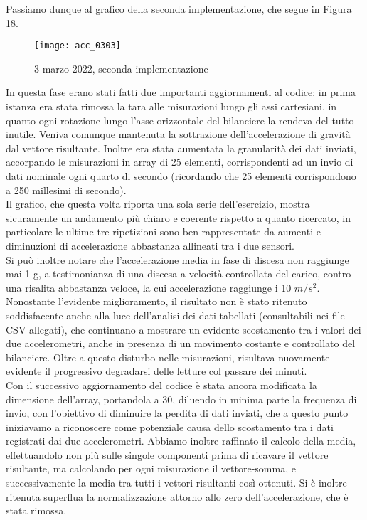 \documentclass[fleqn,10pt]{SelfArx} %
\begin{document}
Passiamo dunque al grafico della seconda implementazione, che segue in Figura 18.

\begin{figure}[htb]\centering
	\texttt{[image: acc\_0303]}
	\caption{3 marzo 2022, seconda implementazione}
	\label{fig:accelerazione 0303}
\end{figure}

In questa fase erano stati fatti due importanti aggiornamenti al codice: in prima istanza era stata rimossa la tara alle 
misurazioni lungo gli assi cartesiani, in quanto ogni rotazione lungo l'asse orizzontale del bilanciere la rendeva del tutto 
inutile. Veniva comunque mantenuta la sottrazione dell'accelerazione di gravità dal vettore risultante. Inoltre era stata 
aumentata la granularità dei dati inviati, accorpando le misurazioni in array di 25 elementi, corrispondenti ad un invio 
di dati nominale ogni quarto di secondo (ricordando che 25 elementi corrispondono a 250 millesimi di secondo).\\
Il grafico, che questa volta riporta una sola serie dell'esercizio, mostra sicuramente un andamento più chiaro e coerente 
rispetto a quanto ricercato, in particolare le ultime tre ripetizioni sono ben rappresentate da aumenti e diminuzioni di 
accelerazione abbastanza allineati tra i due sensori.\\
Si può inoltre notare che l'accelerazione media in fase di discesa non raggiunge mai 1 g, a testimonianza di una discesa 
a velocità controllata del carico, contro una risalita abbastanza veloce, la cui accelerazione raggiunge i 10 $ m/s^2 $.\\

Nonostante l'evidente miglioramento, il risultato non è stato ritenuto soddisfacente anche alla luce dell'analisi dei dati 
tabellati (consultabili nei file CSV allegati), che continuano a mostrare un evidente scostamento tra 
i valori dei due accelerometri, anche in presenza di un movimento costante e controllato del bilanciere.
Oltre a questo disturbo nelle misurazioni, risultava nuovamente evidente il progressivo degradarsi delle letture col passare 
dei minuti.\\

Con il successivo aggiornamento del codice è stata ancora modificata la dimensione dell'array, portandola a 30, diluendo 
in minima parte la frequenza di invio, con l'obiettivo di diminuire la perdita di dati inviati, che a questo punto iniziavamo 
a riconoscere come potenziale causa dello scostamento tra i dati registrati dai due accelerometri. Abbiamo inoltre raffinato 
il calcolo della media, effettuandolo non più sulle singole componenti prima di ricavare il vettore risultante, ma calcolando 
per ogni misurazione il vettore-somma, e successivamente la media tra tutti i vettori risultanti così ottenuti. Si è inoltre 
ritenuta superflua la normalizzazione attorno allo zero dell'accelerazione, che è stata rimossa.
\end{document}

